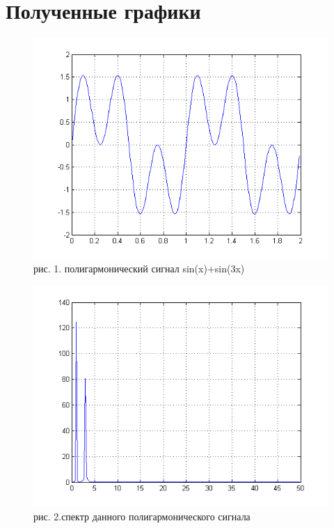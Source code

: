\documentclass[10pt,a4paper]{report}
\begin{document}
\chapter{Полученные графики}
\begin{figure}
\begin{center}
\includegraphics[angle=0, scale = 0.9]{1.png}\newline
рис. 1. полигармонический сигнал sin(x)+sin(3x)\newline
\end{center}
\end{figure}
\begin{figure}
\begin{center}
\includegraphics[angle=0, scale = 0.9]{2.png}\newline
рис. 2.спектр данного полигармонического сигнала\newline
\end{center}
\end{figure}
\end{document}
